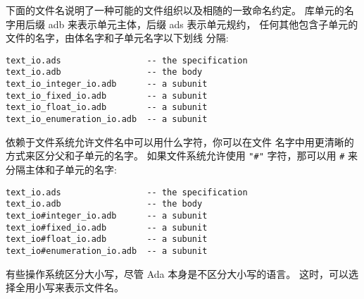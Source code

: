 \begin{blockindent}
下面的文件名说明了一种可能的文件组织以及相随的一致命名约定。
库单元的名字用后缀 adb 来表示单元主体，后缀 ads 表示单元规约，
任何其他包含子单元的文件的名字，由体名字和子单元名字以下划线
分隔:
\begin{lstlisting}
text_io.ads                 -- the specification
text_io.adb                 -- the body
text_io_integer_io.adb      -- a subunit
text_io_fixed_io.adb        -- a subunit
text_io_float_io.adb        -- a subunit
text_io_enumeration_io.adb  -- a subunit
\end{lstlisting}

依赖于文件系统允许文件名中可以用什么字符，你可以在文件
名字中用更清晰的方式来区分父和子单元的名字。
如果文件系统允许使用 \texttt{"\#"} 字符，那可以用 \texttt{\#}
来分隔主体和子单元的名字:
\begin{lstlisting}
text_io.ads                 -- the specification
text_io.adb                 -- the body
text_io#integer_io.adb      -- a subunit
text_io#fixed_io.adb        -- a subunit
text_io#float_io.adb        -- a subunit
text_io#enumeration_io.adb  -- a subunit
\end{lstlisting}

有些操作系统区分大小写，尽管 Ada 本身是不区分大小写的语言。
这时，可以选择全用小写来表示文件名。
\end{blockindent}


